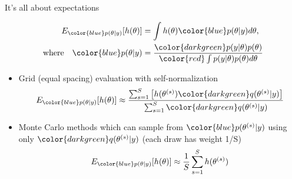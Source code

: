 \documentclass[finnish,english,t]{beamer}
\begin{document}
\begin{frame}

  {\Large\color{navyblue} It's all about expectations}

  \vspace{-1.5\baselineskip}
   \begin{align*}
     E_{\color{blue} p(\theta|y)}[h(\theta)] & = \int h(\theta) {\color{blue} p(\theta|y)} d\theta,\\
     \text{where} \quad
     {\color{blue} p(\theta|y)} & = \frac{\color{darkgreen}p(y|\theta)p(\theta)}{\color{red} \int p(y|\theta)p(\theta) d\theta}
   \end{align*}

 \begin{itemize}
   \vspace{-0.5\baselineskip}
    \item<4-> Grid (equal spacing) evaluation with self-normalization
      \begin{align*}
        E_{\color{blue} p(\theta|y)}[h(\theta)] \approx
        \frac{\sum_{s=1}^S \left[h(\theta^{(s)}){\color{darkgreen}q(\theta^{(s)}|y)}\right]}{\sum_{s=1}^S{\color{darkgreen}q(\theta^{(s)}|y)}}
      \end{align*}
    \item<5-> Monte Carlo methods which can sample from
      ${\color{blue}p(\theta^{(s)}|y)}$ using only
      ${\color{darkgreen}q(\theta^{(s)}|y)}$ {\color{gray}(each draw has weight 1/S)}
         \vspace{-0.5\baselineskip}
      \begin{align*}
        E_{\color{blue} p(\theta|y)}[h(\theta)] \approx \frac{1}{S} \sum_{s=1}^S h(\theta^{(s)})
      \end{align*}
    \end{itemize}
   
\end{frame}
\end{document}
